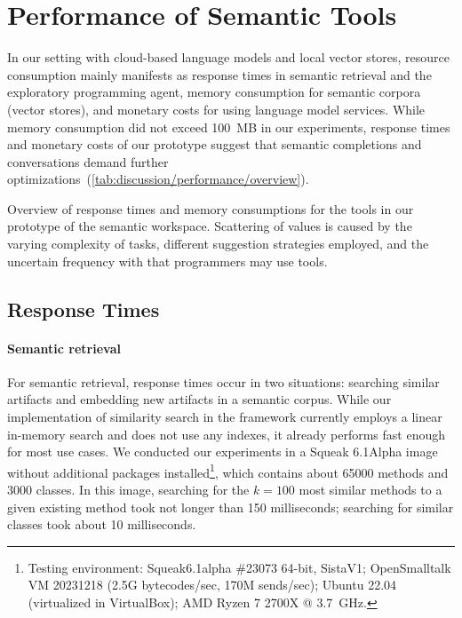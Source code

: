 
\section{Performance of Semantic Tools}
\label{sec:discussion/performance}

In our setting with cloud-based language models and local vector stores, resource consumption mainly manifests as response times in semantic retrieval and the exploratory programming agent, memory consumption for semantic corpora (vector stores), and monetary costs for using language model services.
While memory consumption did not exceed \qty{100}{MB} in our experiments, response times and monetary costs of our prototype suggest that semantic completions and conversations demand further optimizations~(\cref{tab:discussion/performance/overview}).

\begin{table}
	\centering
	\footnotesize
	\caption[Overview of response times and memory consumptions for the tools in our prototype of the semantic workspace.]{
		Overview of response times and memory consumptions for the tools in our prototype of the semantic workspace.
		Scattering of values is caused by the varying complexity of tasks, different suggestion strategies employed, and the uncertain frequency with that programmers may use tools.
	}
	\label{tab:discussion/performance/overview}
\end{table}

\subsection{Response Times}
\label{sec:discussion/performance/latencies}


\paragraph{Semantic retrieval}
\label{par:discussion/performance/latencies/retrieval}

For semantic retrieval, response times occur in two situations: searching similar artifacts and embedding new artifacts in a semantic corpus.
While our implementation of similarity search in the \semtex framework currently employs a linear in-memory search and does not use any indexes, it already performs fast enough for most use cases.
We conducted our experiments in a Squeak 6.1Alpha image without additional packages installed\footnote{Testing environment: Squeak6.1alpha \#23073 64-bit, SistaV1; OpenSmalltalk VM 20231218 (2.5G bytecodes/sec, 170M sends/sec); Ubuntu 22.04 (virtualized in VirtualBox); AMD Ryzen 7 2700X @ \qty{3.7}{GHz}.}, which contains about \num{65000} methods and \num{3000} classes.
In this image, searching for the $k = 100$ most similar methods to a given existing method took not longer than 150 milliseconds; searching for similar classes took about 10 milliseconds.

